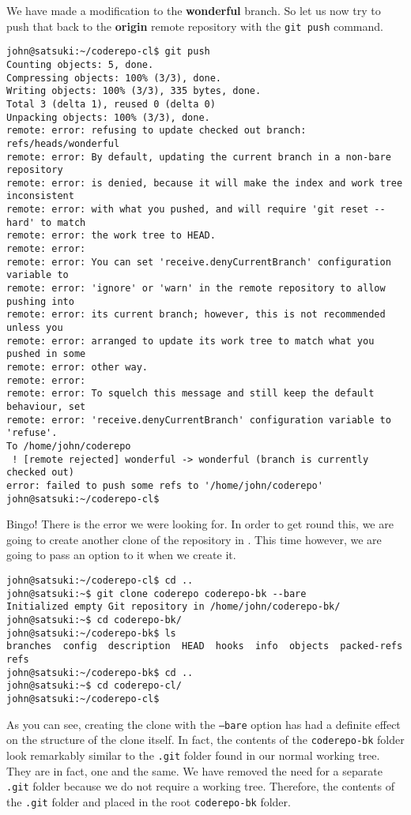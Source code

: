 We have made a modification to the \textbf{wonderful} branch.  So let us now try to push that back to the \textbf{origin} remote repository with the \texttt{git push} command.
 
\begin{Verbatim}[frame=leftline,framerule=1mm,fontsize=\relsize{-3}] 
john@satsuki:~/coderepo-cl$ git push
Counting objects: 5, done.
Compressing objects: 100% (3/3), done.
Writing objects: 100% (3/3), 335 bytes, done.
Total 3 (delta 1), reused 0 (delta 0)
Unpacking objects: 100% (3/3), done.
remote: error: refusing to update checked out branch: refs/heads/wonderful
remote: error: By default, updating the current branch in a non-bare repository
remote: error: is denied, because it will make the index and work tree inconsistent
remote: error: with what you pushed, and will require 'git reset --hard' to match
remote: error: the work tree to HEAD.
remote: error: 
remote: error: You can set 'receive.denyCurrentBranch' configuration variable to
remote: error: 'ignore' or 'warn' in the remote repository to allow pushing into
remote: error: its current branch; however, this is not recommended unless you
remote: error: arranged to update its work tree to match what you pushed in some
remote: error: other way.
remote: error: 
remote: error: To squelch this message and still keep the default behaviour, set
remote: error: 'receive.denyCurrentBranch' configuration variable to 'refuse'.
To /home/john/coderepo
 ! [remote rejected] wonderful -> wonderful (branch is currently checked out)
error: failed to push some refs to '/home/john/coderepo'
john@satsuki:~/coderepo-cl$ 
\end{Verbatim}

Bingo!  There is the error we were looking for.  In order to get round this, we are going to create another clone of the repository in .  This time however, we are going to pass an option to it when we create it.

\begin{Verbatim}[frame=leftline,framerule=1mm,fontsize=\relsize{-3}] 
john@satsuki:~/coderepo-cl$ cd ..
john@satsuki:~$ git clone coderepo coderepo-bk --bare
Initialized empty Git repository in /home/john/coderepo-bk/
john@satsuki:~$ cd coderepo-bk/
john@satsuki:~/coderepo-bk$ ls
branches  config  description  HEAD  hooks  info  objects  packed-refs  refs
john@satsuki:~/coderepo-bk$ cd ..
john@satsuki:~$ cd coderepo-cl/
john@satsuki:~/coderepo-cl$ 
\end{Verbatim}

As you can see, creating the clone with the \texttt{--bare} option has had a definite effect on the structure of the clone itself.  In fact, the contents of the \texttt{coderepo-bk} folder look remarkably similar to the \texttt{.git} folder found in our normal working tree.  They are in fact, one and the same.  We have removed the need for a separate \texttt{.git} folder because we do not require a working tree.  Therefore, the contents of the \texttt{.git} folder and placed in the root \texttt{coderepo-bk} folder.

